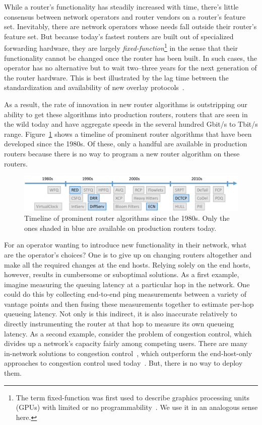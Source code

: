 While a router's functionality has steadily increased with time, there's little
consensus between network operators and router vendors on a router's feature
set. Inevitably, there are network operators whose needs fall outside their
router's feature set. But because today's fastest routers are built out of
specialized forwarding hardware, they are largely {\em
fixed-function}\footnote{The term fixed-function was first used to describe
graphics processing units (GPUs) with limited or no
programmability~\cite{gpu_fixed}. We use it in an analogous sense here.} in the
sense that their functionality cannot be changed once the router has been
built. In such cases, the operator has no alternative but to wait two--three
years for the next generation of the router hardware. This is best illustrated
by the lag time between the standardization and availability of new overlay
protocols~\cite{nvgre}.

As a result, the rate of innovation in new router algorithms is outstripping
our ability to get these algorithms into production routers, \ie routers that
are seen in the wild today and have aggregate speeds in the several hundred
Gbit/s to Tbit/s range.  Figure~\ref{fig:router_algos} shows a timeline of
prominent router algorithms that have been developed since the 1980s. Of these,
only a handful are available in production routers because there is no way to
program a new router algorithm on these routers.

\begin{figure}
\centering
\includegraphics[width=\columnwidth]{router_alg_timeline.pdf}
\caption{Timeline of prominent router algorithms since the 1980s. Only the ones
shaded in blue are available on production routers today.}
\label{fig:router_algos}
\end{figure}

For an operator wanting to introduce new functionality in their network, what
are the operator's choices? One is to give up on changing routers altogether
and make all the required changes at the end hosts.  Relying solely on the end
hosts, however, results in cumbersome or suboptimal solutions. As a first
example, imagine measuring the queuing latency at a particular hop in the
network. One could do this by collecting end-to-end ping measurements between a
variety of vantage points and then fusing these measurements together to
estimate per-hop queueing latency. Not only is this indirect, it is also
inaccurate relatively to directly instrumenting the router at that hop to
measure its own queueing latency. As a second example, consider the problem of
congestion control, which divides up a network's capacity fairly among
competing users. There are many in-network solutions to congestion
control~\cite{xcp, rcp}, which outperform the end-host-only approaches to
congestion control used today~\cite{cubic, compound}. But, there is no way to
deploy them.

